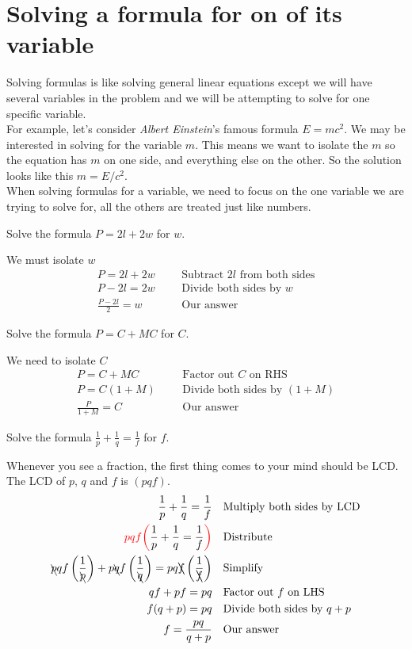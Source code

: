 \section{Solving a formula for on of its variable}
Solving formulas is like solving general linear equations except we will have several variables in the problem and we will be attempting to solve for one specific variable.\\
For example, let's consider \textit{Albert Einstein}'s famous formula $E=mc^2$. We may be interested in solving for the variable $m$. This means we want to isolate the $m$ so the equation has
$m$ on one side, and everything else on the other. So the solution looks like this $m=E/c^2$.\\
When solving formulas for a variable, we need to focus on the one variable we are trying to solve for, all the others are treated just like numbers.
\begin{exa}
     Solve the formula $P=2l+2w$ for $w$.
\end{exa}
We must isolate $w$
\begin{align*}
    P=2l+2w&    &   &\text{Subtract $2l$ from both sides}\\
    P-2l=2w&    &   &\text{Divide both sides by $w$}\\
    \frac{P-2l}{2}=w&   &   &\text{Our answer}
\end{align*}
\begin{exa}
     Solve the formula $P=C+MC$ for $C$.
\end{exa}
%
We need to isolate $C$
\begin{align*}
    P=C+MC&    &   &\text{Factor out $C$ on RHS}\\
    P=C(1+M)&    &   &\text{Divide both sides by $(1+M)$}\\
    \frac{P}{1+M}=C&   &   &\text{Our answer}
\end{align*}
\begin{exa}
     Solve the formula $\frac{1}{p}+\frac{1}{q}=\frac{1}{f}$ for $f$.
\end{exa}
Whenever you see a fraction, the first thing comes to your mind should be LCD. The LCD of $p$, $q$ and $f$ is $(pqf)$. 
\begin{align*}
    \frac{1}{p}+\frac{1}{q}=\frac{1}{f}&    &   &\text{Multiply both sides by LCD}\\
    \textcolor{red}{pqf\biggl(}  \frac{1}{p}+\frac{1}{q}=\frac{1}{f} \textcolor{red}{\biggr)}&
    &&\text{Distribute}\\
    \bcancel{p}qf\left(\frac{1}{\bcancel{p}}\right)+p\bcancel{q}f\left(\frac{1}{\bcancel{q}}\right)=pq\bcancel{f}\left(\frac{1}{\bcancel{f}}\right)&
    &&\text{Simplify}\\
    qf+pf=pq&   &   &\text{Factor out $f$ on LHS}\\
    f(q+p)=pq&  &   &\text{Divide both sides by $q+p$}\\
    f = \frac{pq}{q+p}& &   &\text{Our answer}
\end{align*}
